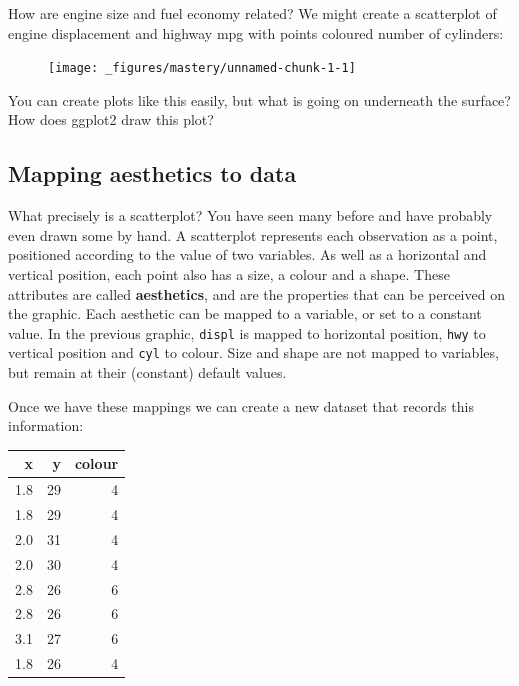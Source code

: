 How are engine size and fuel economy related? We might create a
scatterplot of engine displacement and highway mpg with points coloured
number of cylinders:

\begin{Shaded}
\begin{Highlighting}[]
 
\StringTok{  }\NormalTok{()}
\end{Highlighting}
\end{Shaded}

\begin{figure}[H]
  \centering
  \texttt{[image: \_figures/mastery/unnamed-chunk-1-1]}
\end{figure}

You can create plots like this easily, but what is going on underneath
the surface? How does ggplot2 draw this plot?

\subsection{Mapping aesthetics to data}

What precisely is a scatterplot? You have seen many before and have
probably even drawn some by hand. A scatterplot represents each
observation as a point, positioned according to the value of two
variables. As well as a horizontal and vertical position, each point
also has a size, a colour and a shape. These attributes are called
\textbf{aesthetics}, and are the properties that can be perceived on the
graphic. Each aesthetic can be mapped to a variable, or set to a
constant value. In the previous graphic, \texttt{displ} is mapped to
horizontal position, \texttt{hwy} to vertical position and \texttt{cyl}
to colour. Size and shape are not mapped to variables, but remain at
their (constant) default values. 

Once we have these mappings we can create a new dataset that records
this information:

\begin{longtable}[c]{@{}rrr@{}}
\toprule
x & y & colour\tabularnewline
\midrule
\endhead
1.8 & 29 & 4\tabularnewline
1.8 & 29 & 4\tabularnewline
2.0 & 31 & 4\tabularnewline
2.0 & 30 & 4\tabularnewline
2.8 & 26 & 6\tabularnewline
2.8 & 26 & 6\tabularnewline
3.1 & 27 & 6\tabularnewline
1.8 & 26 & 4\tabularnewline
\bottomrule
\end{longtable}

